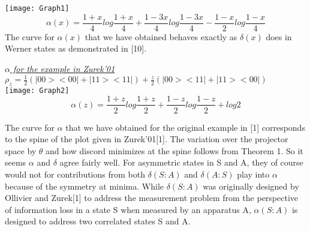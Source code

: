 \documentclass[8pt]{article}
\begin{document}
\begin{multicols}{2}
\texttt{[image: Graph1]}
\\
\[\alpha(x)= \frac{1+x}{4}log\frac{1+x}{4} + \frac{1-3x}{4}log\frac{1-3x}{4} - \frac{1-x}{2}log\frac{1-x}{4}\]
The curve for $\alpha(x)$ that we have obtained behaves exactly as $\delta(x)$ does in Werner states as demonstrated in [10].
\end{multicols}

\textit{\underline{$\alpha$ for the example in Zurek'01}} 
\textbf{$\rho_{z}= \frac{1}{2}(|00><00| + |11><11|) + \frac{z}{2}(|00><11| + |11><00|)$}\\
\texttt{[image: Graph2]}
\[\alpha(z)= \frac{1+z}{2}log\frac{1+z}{2} + \frac{1-z}{2}log\frac{1-z}{2} + log2\]

The curve for $\alpha$ that we have obtained for the original example in [1] corresponds to the spine of the plot given in Zurek'01[1]. The variation over the projector space by $\theta$ and how discord minimizes at the spine follows from Theorem 1. So it seems $\alpha$ and $\delta$ agree fairly well. For asymmetric states in S and A, they of course would not for contributions from both $\delta(S:A)$ and $\delta(A:S)$ play into $\alpha$ because of the symmetry at minima. While $\delta(S:A)$ was originally designed by Ollivier and Zurek[1] to address the measurement problem from the perspective of information loss in a state S when measured by an apparatus A, $\alpha(S:A)$ is designed to address two correlated states S and A.
\end{document}
